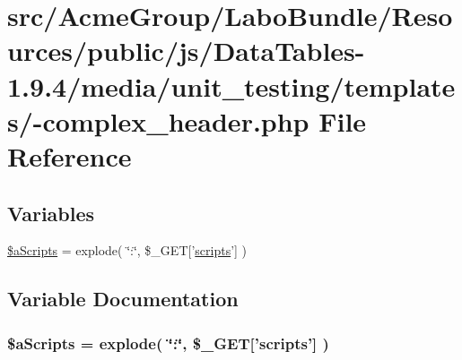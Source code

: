 \hypertarget{-complex__header_8php}{\section{src/\+Acme\+Group/\+Labo\+Bundle/\+Resources/public/js/\+Data\+Tables-\/1.9.4/media/unit\+\_\+testing/templates/-\/complex\+\_\+header.php File Reference}
\label{-complex__header_8php}
}
\subsection*{Variables}
\begin{DoxyCompactItemize}
\item 
\hyperlink{-complex__header_8php_a3e8e1608000c9afdd05327fc2b06b056}{\$a\+Scripts} = explode( \char`\"{}\+:\char`\"{}, \$\+\_\+\+G\+E\+T\mbox{[}'\hyperlink{tinymce_8jquery_8dev_8js_a09066d4d580eeec222f858d588b4cdef}{scripts}'\mbox{]} )
\end{DoxyCompactItemize}


\subsection{Variable Documentation}
\hypertarget{-complex__header_8php_a3e8e1608000c9afdd05327fc2b06b056}{
\subsubsection[{\$a\+Scripts}]{\setlength{\rightskip}{0pt plus 5cm}\$a\+Scripts = explode( \char`\"{}\+:\char`\"{}, \$\+\_\+\+G\+E\+T\mbox{[}'{\bf scripts}'\mbox{]} )}}\label{-complex__header_8php_a3e8e1608000c9afdd05327fc2b06b056}
